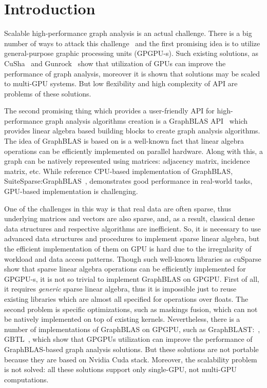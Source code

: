 \section{Introduction}

Scalable high-performance graph analysis is an actual challenge.
There is a big number of ways to attack this challenge~\cite{Coimbra2021} and the first promising idea is to utilize general-purpose graphic processing units (GPGPU-s).
Such existing solutions, as CuSha~\cite{10.1145/2600212.2600227} and Gunrock~\cite{7967137} show that utilization of GPUs can improve the performance of graph analysis, moreover it is shown that solutions may be scaled to multi-GPU systems.
But low flexibility and high complexity of API are problems of these solutions.

The second promising thing which provides a user-friendly API for high-performance graph analysis algorithms creation is a GraphBLAS API~\cite{7761646} which provides linear algebra based building blocks to create graph analysis algorithms.
The idea of GraphBLAS is based on is a well-known fact that linear algebra operations can be efficiently implemented on parallel hardware.
Along with this, a graph can be natively represented using matrices: adjacency matrix, incidence matrix, etc.
While reference CPU-based implementation of GraphBLAS, SuiteSparse:GraphBLAS~\cite{10.1145/3322125}, demonstrates good performance in real-world tasks, GPU-based implementation is challenging.

One of the challenges in this way is that real data are often sparse, thus underlying matrices and vectors are also sparse, and, as a result, classical dense data structures and respective algorithms are inefficient. 
So, it is necessary to use advanced data structures and procedures to implement sparse linear algebra, but the efficient implementation of them on GPU is hard due to the irregularity of workload and data access patterns.
Though such well-known libraries as cuSparse show that sparse linear algebra operations can be efficiently implemented for GPGPU-s, it is not so trivial to implement GraphBLAS on GPGPU. 
First of all, it requires \textit{generic} sparse linear algebra, thus it is impossible just to reuse existing libraries which are almost all specified for operations over floats.
The second problem is specific optimizations, such as maskings fusion, which can not be natively implemented on top of existing kernels.
Nevertheless, there is a number of implementations of GraphBLAS on GPGPU, such as GraphBLAST:~\cite{yang2019graphblast}, GBTL~\cite{7529957}, which show that GPGPUs utilization can improve the performance of GraphBLAS-based graph analysis solutions.
But these solutions are not portable because they are based on Nvidia Cuda stack.
Moreover, the scalability problem is not solved: all these solutions support only single-GPU, not multi-GPU computations.

